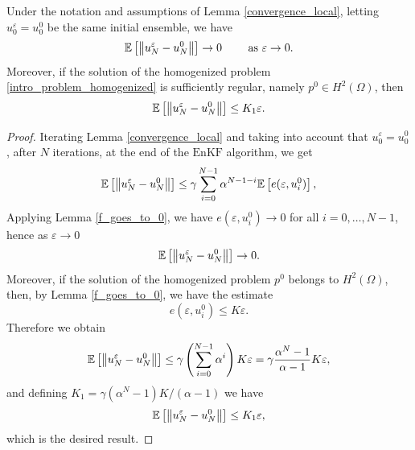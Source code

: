 \documentclass[10pt]{article}
\begin{document}
\begin{proposition} \label{convergence_result}
Under the notation and assumptions of Lemma \ref{convergence_local}, letting $u_0^{\varepsilon} = u_0^0$ be the same initial ensemble, we have
\[ \mathbb{E} \left [ \left\|u_N^{\varepsilon} - u_N^0\right\| \right ] \to 0 \qquad \text{ as } \varepsilon \to 0.  \]
Moreover, if the solution of the homogenized problem \eqref{intro_problem_homogenized} is sufficiently regular, namely $p^0 \in H^2(\Omega)$, then 
\[ \mathbb{E} \left [ \left\|u_N^{\varepsilon} - u_N^0\right\| \right ] \le K_1 \varepsilon. \]
\end{proposition}
\begin{proof}
	Iterating Lemma \ref{convergence_local} and taking into account that $u_0^{\varepsilon} = u_0^0$, after $N$ iterations, at the end of the $\mathrm{EnKF}$ algorithm, we get
	\begin{equation*}
		\mathbb{E} \left [ \left\|u_N^{\varepsilon} - u_N^0\right\| \right ] \le \gamma \sum_{i=0}^{N-1} \alpha^{N-1-i} \mathbb{E} \left [ e(\varepsilon, u^0_i) \right ],
	\end{equation*}
	Applying Lemma \ref{f_goes_to_0}, we have $e(\varepsilon, u_i^0) \to 0$ for all $i = 0, \dots, N-1$, hence as $\varepsilon \to 0$
	\begin{equation*}
		\mathbb{E} \left [ \left\|u_N^{\varepsilon} - u_N^0\right\| \right ] \to 0.
	\end{equation*}
	Moreover, if the solution of the homogenized problem $p^0$ belongs to $H^2(\Omega)$, then, by Lemma \ref{f_goes_to_0}, we have the estimate 
	\[ e(\varepsilon, u_i^0) \le K \varepsilon. \]
	Therefore we obtain
	\begin{equation*}
	\mathbb{E} \left [ \left\|u_N^{\varepsilon} - u_N^0\right\| \right ] \le \gamma \left ( \sum_{i=0}^{N-1} \alpha^{i} \right ) K \varepsilon = \gamma \frac{\alpha^N - 1}{\alpha - 1} K \varepsilon,
	\end{equation*}
	and defining $K_1 = \gamma (\alpha^N - 1) K /(\alpha - 1)$ we have
	\[ \mathbb{E} \left [ \left\|u_N^{\varepsilon} - u_N^0\right\| \right ] \le K_1 \varepsilon, \]
	which is the desired result.
\end{proof}
\end{document}
